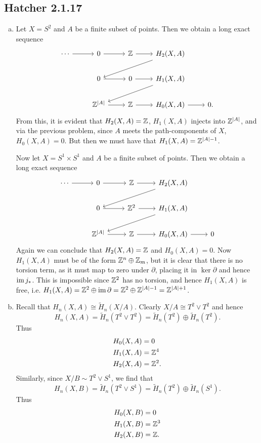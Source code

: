 \documentclass{../mathnotes}
\begin{document}
\subsection*{Hatcher 2.1.17}
\begin{enumerate}[(a)]
    \item Let $X=S^2$ and $A$ be a finite subset of points. Then we obtain a long exact sequence
        \begin{equation*}
            \begin{tikzcd}
                \cdots\ar{r} & 0\ar{r} & \Z\ar{r} & H_2(X,A)\ar{dll}\\
                & 0\ar{r} & 0\ar{r} & H_1(X,A)\ar{dll}\\
                & \Z^{|A|}\ar{r} & \Z\ar{r} & H_0(X,A)\ar{r} & 0.
            \end{tikzcd}
        \end{equation*}
        From this, it is evident that $H_2(X,A)=\mathbb{Z}$, $H_1(X,A)$ injects into $\mathbb{Z}^{|A|}$, and via the previous
        problem, since $A$ meets the path-components of $X$, $H_0(X,A)=0$. But then we must have that
        $H_1(X,A)=\mathbb{Z}^{|A|-1}$.

        Now let $X=S^1\times S^1$ and $A$ be a finite subset of points. Then we obtain a long exact sequence
        \begin{equation*}
            \begin{tikzcd}
                \cdots\ar{r} & 0\ar{r} & \Z\ar{r} & H_2(X,A)\ar{dll}\\
                & 0\ar{r} & \Z^2\ar{r} & H_1(X,A)\ar{dll}\\
                & \Z^{|A|}\ar{r} & \Z\ar{r} & H_0(X,A)\ar{r} & 0
            \end{tikzcd}
        \end{equation*}
        Again we can conclude that $H_2(X,A)=\mathbb{Z}$ and $H_0(X,A)=0$. Now $H_1(X,A)$ must be of the form $\mathbb{Z}^n\oplus\mathbb{Z}_m$,
        but it is clear that there is no torsion term, as it must map to zero under $\partial$, placing it in $\ker\partial$
        and hence $\operatorname{im} j_*$. This is impossible since $\mathbb{Z}^2$ has no torsion, and hence $H_1(X,A)$ is free, i.e.
        $H_1(X,A)=\mathbb{Z}^2\oplus\operatorname{im}\partial=\mathbb{Z}^2\oplus\mathbb{Z}^{|A|-1}=\mathbb{Z}^{|A|+1}$.
    \item Recall that $H_n(X,A)\cong \tilde H_n(X/A)$. Clearly $X/A\cong T^2\vee T^2$ and hence
        \[H_n(X,A)=\tilde H_n(T^2\vee T^2)=\tilde H_n(T^2)\oplus\tilde H_n(T^2).\]
        Thus
        \begin{align*}
            H_0(X,A) &= 0\\
            H_1(X,A) &= \mathbb{Z}^4\\
            H_2(X,A) &= \mathbb{Z}^2.
        \end{align*}
        Similarly, since $X/B\sim T^2\vee S^1$, we find that
        \[H_n(X,B)=\tilde H_n(T^2\vee S^1)=\tilde H_n(T^2)\oplus\tilde H_n(S^1).\]
        Thus
        \begin{align*}
            H_0(X,B) &= 0\\
            H_1(X,B) &= \mathbb{Z}^3\\
            H_2(X,B) &= \mathbb{Z}.
        \end{align*}
\end{enumerate}
\end{document}
